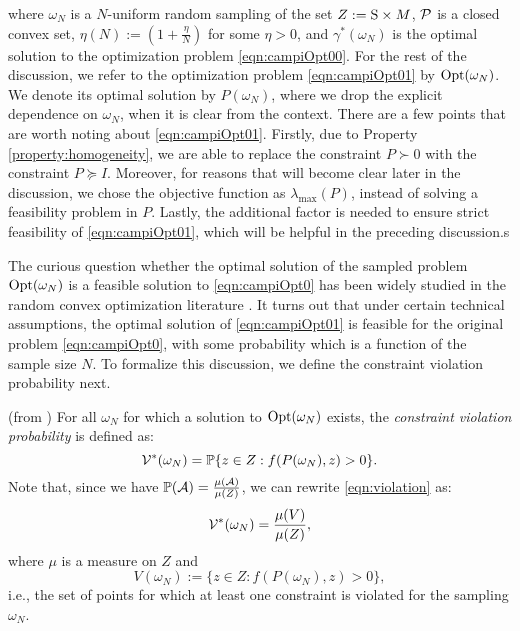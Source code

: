 where $\omega_N$ is a $N$-uniform random sampling of the set \mbox{$Z:=\text{S} \times M$}, $\mathcal{P}$ is a closed convex set, $\eta(N):=\left(1+\frac{\eta}{N}\right)$ for some $\eta > 0$, and $\gamma^*(\omega_N)$ is the optimal solution to the optimization problem \eqref{eqn:campiOpt00}. For the rest of the discussion, we refer to the optimization problem \eqref{eqn:campiOpt01} by $ \text{Opt}(\omega_N)$. We denote its optimal solution by $P(\omega_N)$, where we drop the explicit dependence on $\omega_N$, when it is clear from the context. There are a few points that are worth noting about \eqref{eqn:campiOpt01}. Firstly, due to Property \ref{property:homogeneity}, we are able to replace the constraint $P \succ 0$ with the constraint $P \succeq I$. Moreover, for reasons that will become clear later in the discussion, we chose the objective function as $\lambda_{\max}(P)$, instead of solving a feasibility problem in $P$. Lastly, the additional factor is needed to ensure strict feasibility of \eqref{eqn:campiOpt01}, which will be helpful in the preceding discussion.s

The curious question whether the optimal solution of the sampled problem $\text{Opt}(\omega_N)$ is a feasible solution to \eqref{eqn:campiOpt0} has been widely studied in the random convex optimization literature \cite{campi}. It turns out that under certain technical assumptions, the optimal solution of \eqref{eqn:campiOpt01} is feasible for the original problem \eqref{eqn:campiOpt0}, with some probability which is a function of the sample size $N$. To formalize this discussion, we define the constraint violation probability next.

\begin{definition}(from \cite{campi}) For all $\omega_N$ for which a solution to $\text{Opt}(\omega_N)$ exists, the \emph{constraint violation probability} is defined as:
\begin{equation}\label{eqn:violation}
\mathcal{V}^*(\omega_N)=
      \mathbb{P}\{z \in Z: f(P(\omega_N), z) > 0\}.
\end{equation}
Note that, since we have $\mathbb{P}(\mathcal{A}) = \frac{\mu(\mathcal{A})}{\mu(Z)}$, we can rewrite \eqref{eqn:violation} as:
\begin{equation*}
\mathcal{V}^*(\omega_N)=
      \frac{\mu(V)}{\mu(Z)},
\end{equation*}
where $\mu$ is a measure on $Z$ and $$V(\omega_N):=\{z \in Z: f(P(\omega_N), z) > 0\},$$ i.e., the set of points for which at least one constraint is violated for the sampling $\omega_N$.
\end{definition}

